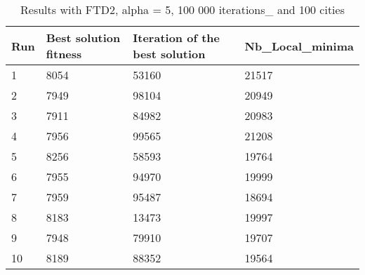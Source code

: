 \documentclass[12pt,oneside,a4paper]{article}
\begin{document}
\begin{table}[h]
  \centering
  \small
  \begin{tabular}{llll}
    \hline
    \multicolumn{1}{|l|}{\textbf{Run}}& \multicolumn{1}{l|}{\textbf{Best solution fitness}}& \multicolumn{1}{l|}{\textbf{Iteration of the best solution}}& \multicolumn{1}{l|}{\textbf{Nb\_Local\_minima}}\\ \hline
    \multicolumn{1}{|l|}{1} & \multicolumn{1}{l|}{8054}  & \multicolumn{1}{l|}{53160} & \multicolumn{1}{l|}{21517}  \\ \hline
    \multicolumn{1}{|l|}{2} & \multicolumn{1}{l|}{7949}  & \multicolumn{1}{l|}{98104} & \multicolumn{1}{l|}{20949}  \\ \hline
    \multicolumn{1}{|l|}{3} & \multicolumn{1}{l|}{7911}  & \multicolumn{1}{l|}{84982}  & \multicolumn{1}{l|}{20983}  \\ \hline
    \multicolumn{1}{|l|}{4} & \multicolumn{1}{l|}{7956}  & \multicolumn{1}{l|}{99565}  & \multicolumn{1}{l|}{21208}  \\ \hline
    \multicolumn{1}{|l|}{5} & \multicolumn{1}{l|}{8256}  & \multicolumn{1}{l|}{58593}  & \multicolumn{1}{l|}{19764}  \\ \hline
    \multicolumn{1}{|l|}{6} & \multicolumn{1}{l|}{7955}  & \multicolumn{1}{l|}{94970}  & \multicolumn{1}{l|}{19999}  \\ \hline
    \multicolumn{1}{|l|}{7} & \multicolumn{1}{l|}{7959}  & \multicolumn{1}{l|}{95487}  & \multicolumn{1}{l|}{18694}  \\ \hline
    \multicolumn{1}{|l|}{8} & \multicolumn{1}{l|}{8183}  & \multicolumn{1}{l|}{13473} & \multicolumn{1}{l|}{19997}  \\ \hline
    \multicolumn{1}{|l|}{9} & \multicolumn{1}{l|}{7948}  & \multicolumn{1}{l|}{79910} & \multicolumn{1}{l|}{19707}  \\ \hline
    \multicolumn{1}{|l|}{10} & \multicolumn{1}{l|}{8189}  & \multicolumn{1}{l|}{88352} & \multicolumn{1}{l|}{19564}  \\ \hline
  \end{tabular}
  \caption{Results with FTD2, alpha = 5, 100 000 iterations\_ and 100 cities}
\end{table}
\end{document}
